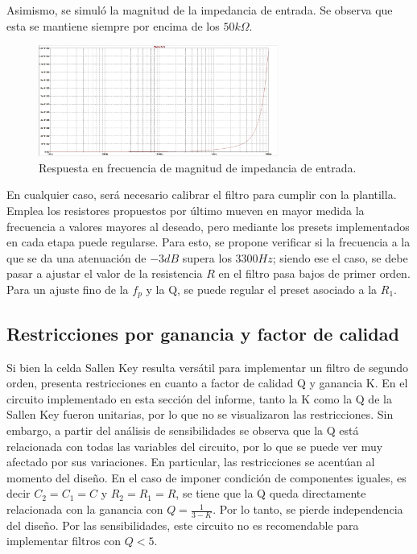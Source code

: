 Asimismo, se simuló la magnitud de la impedancia de entrada. Se observa que esta se mantiene siempre por encima de los $50k\Omega$. 

\begin{figure}[H]
    \centering
        \includegraphics[width= 0.7\textwidth]{../Ejercicio2-DisenoDeCeldas/1CeldaSallenKey/images/Zin.png}
    \caption{Respuesta en frecuencia de magnitud de impedancia de entrada.}
    \label{fig:Zin}
\end{figure}



En cualquier caso, será necesario calibrar el filtro para cumplir con la plantilla. Emplea los resistores propuestos por último mueven en mayor medida la frecuencia a valores mayores al deseado, pero mediante los presets implementados en cada etapa puede regularse. Para esto, se propone verificar si la frecuencia a la que se da una atenuación de $-3dB$ supera los $3300Hz$; siendo ese el caso, se debe pasar a ajustar el valor de la resistencia $R$ en el filtro pasa bajos de primer orden. Para un ajuste fino de la $f_{p}$ y la Q, se puede regular el preset asociado a la $R_{1}$.



\subsection{Restricciones por ganancia y factor de calidad}

Si bien la celda Sallen Key resulta versátil para implementar un filtro de segundo orden, presenta restricciones en cuanto a factor de calidad Q y ganancia K. En el circuito implementado en esta sección del informe, tanto la K como la Q de la Sallen Key fueron unitarias, por lo que no se visualizaron las restricciones. Sin embargo, a partir del análisis de sensibilidades se observa que la Q está relacionada con todas las variables del circuito, por lo que se puede ver muy afectado por sus variaciones. En particular, las restricciones se acentúan al momento del diseño. En el caso de imponer condición de componentes iguales, es decir $C_{2} = C_{1} = C$ y $R_{2} = R_{1} = R$, se tiene que la Q queda directamente relacionada con la ganancia con $Q = \frac{1}{3-K}$. Por lo tanto, se pierde independencia del diseño. Por las sensibilidades, este circuito no es recomendable para implementar filtros con $Q<5$. 

